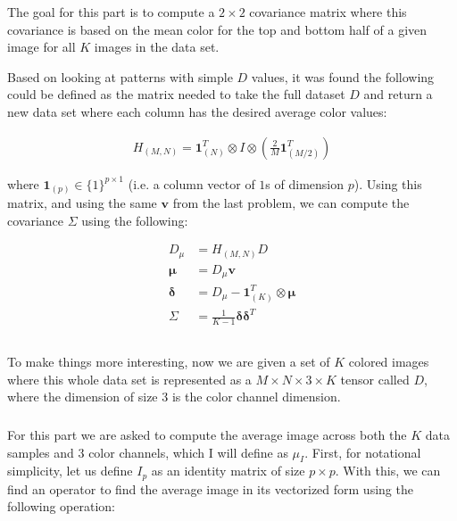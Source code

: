 \documentclass{article}[12pt]
\begin{document}
	\subsubsection{}
	The goal for this part is to compute a $2 \times 2$ covariance matrix where this covariance is based on the mean color for the top and bottom half of a given image for all $K$ images in the data set. 
	
	Based on looking at patterns with simple $D$ values, it was found the following could be defined as the matrix needed to take the full dataset $D$ and return a new data set where each column has the desired average color values:
	
	\begin{align*}
	H_{(M,N)} = \boldsymbol{1}_{(N)}^{T} \otimes I \otimes \left( \frac{2}{M} \boldsymbol{1}_{(M/2)}^{T}\right)
	\end{align*}
	
	where $\boldsymbol{1}_{(p)} \in \{1 \}^{p \times 1}$ (i.e. a column vector of $1$s of dimension $p$). Using this matrix, and using the same $\boldsymbol{v}$ from the last problem, we can compute the covariance $\Sigma$ using the following:
	
	\begin{align*}
	D_{\mu} &= H_{(M,N)}D \\
	\boldsymbol{\mu} &= D_{\mu} \boldsymbol{v} \\
	\boldsymbol{\delta} &= D_{\mu} - \boldsymbol{1}_{(K)}^{T} \otimes \boldsymbol{\mu} \\
	\Sigma &= \frac{1}{K-1} \boldsymbol{\delta} \boldsymbol{\delta}^{T}
	\end{align*}
	
	\subsection{}
	To make things more interesting, now we are given a set of $K$ colored images where this whole data set is represented as a $M \times N \times 3 \times K$ tensor called $D$, where the dimension of size 3 is the color channel dimension.
	
	\subsubsection{}
	For this part we are asked to compute the average image across both the $K$ data samples and $3$ color channels, which I will define as $\mu_I$. First, for notational simplicity, let us define $I_p$ as an identity matrix of size $p \times p$. With this, we can find an operator to find the average image in its vectorized form using the following operation:
	
\end{document}
